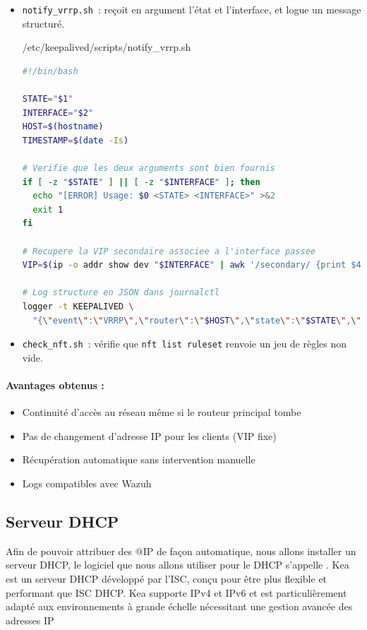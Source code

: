 \documentclass{article}
\begin{document}
\begin{itemize}
  \item \texttt{notify_vrrp.sh}~: reçoit en argument l'état et l'interface, et logue un message structuré.
  \begin{codebox}{/etc/keepalived/scripts/notify_vrrp.sh}
	\begin{lstlisting}[language=Bash]
#!/bin/bash

STATE="$1"
INTERFACE="$2"
HOST=$(hostname)
TIMESTAMP=$(date -Is)

# Verifie que les deux arguments sont bien fournis
if [ -z "$STATE" ] || [ -z "$INTERFACE" ]; then
  echo "[ERROR] Usage: $0 <STATE> <INTERFACE>" >&2
  exit 1
fi

# Recupere la VIP secondaire associee a l'interface passee
VIP=$(ip -o addr show dev "$INTERFACE" | awk '/secondary/ {print $4}' | head -n1)

# Log structure en JSON dans journalctl
logger -t KEEPALIVED \
  "{\"event\":\"VRRP\",\"router\":\"$HOST\",\"state\":\"$STATE\",\"interface\":\"$INTERFACE\",\"vip\":\"$VIP\",\"timestamp\":\"$TIMESTAMP\"}"
	\end{lstlisting}
  \end{codebox}
	
  \item \texttt{check_nft.sh}~: vérifie que \texttt{nft list ruleset} renvoie un jeu de règles non vide.
\end{itemize}

\paragraph{Avantages obtenus :}
\begin{itemize}
  \item Continuité d’accès au réseau même si le routeur principal tombe
  \item Pas de changement d’adresse IP pour les clients (VIP fixe)
  \item Récupération automatique sans intervention manuelle
  \item Logs compatibles avec Wazuh
\end{itemize}


\subsection{Serveur DHCP}
Afin de pouvoir attribuer des @IP de façon automatique, nous allons installer un serveur DHCP, le logiciel que nous allons utiliser pour le DHCP s'appelle . Kea est un serveur DHCP développé par l'ISC, conçu pour être plus flexible et performant que ISC DHCP. Kea supporte IPv4 et IPv6 et est particulièrement adapté aux environnements à grande échelle nécessitant une gestion avancée des adresses IP
\end{document}
